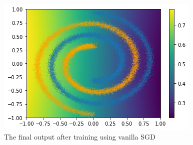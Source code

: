 \documentclass[twocolumn]{article}
\begin{document}
\begin{figure}[ht!]
\begin{center}
  \centerline{\includegraphics[width=\columnwidth]{src/vanilla_sol.png}}
  \caption{The final output after training using vanilla SGD}
  \label{van_sol}
\end{center}
\vskip -0.2in
\end{figure}



\end{document}

